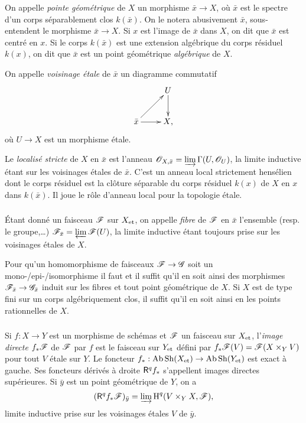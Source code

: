 \documentclass[oneside]{book}
\begin{document}
On appelle \emph{pointe géométrique} de $X$ un morphisme $\bar x\to X$, où 
$\bar x$ est le spectre d'un corps séparablement clos $k(\bar x)$. On le notera 
abusivement $\bar x$, sous-entendent le morphisme $\bar x\to X$. Si $x$ est 
l'image de $\bar x$ dans $X$, on dit que $\bar x$ est centré en $x$. Si le 
corps $k(\bar x)$ est une extension algébrique du corps résiduel $k(x)$, on dit 
que $\bar x$ est un point géométrique \emph{algébrique} de $X$. 

On appelle \emph{voisinage étale} de $\bar x$ un diagramme commutatif 
\[\xymatrix{
  & U \ar[d] \\
  \bar x \ar[ur] \ar[r] 
  & X\text{,}
}\]
où $U\to X$ est un morphisme étale. 

Le \emph{localisé stricte} de $X$ en $\bar x$ est l'anneau 
$\mathscr{O}_{X,\bar x} = \varinjlim \Gamma(U,\mathscr{O}_U)$, la limite inductive étant sur les 
voisinages étales de $\bar x$. C'est un anneau local strictement hensélien dont 
le corps résiduel est la clôture séparable du corps résiduel $k(x)$ de $X$ en 
$x$ dans $k(\bar x)$. Il joue le rôle d'anneau local pour la topologie étale. 





\subsubsection{}\label{I:2-3-2}

Étant donné un faisceau $\mathscr{F}$ sur ${X}_{\textnormal{et}}$, on appelle \emph{fibre} de $\mathscr{F}$ en 
$\bar x$ l'ensemble (resp. le groupe,\dots) $\mathscr{F}_{\bar x}=\varprojlim \mathscr{F}(U)$, 
la limite inductive étant toujours prise sur les voisinages étales de  $X$. 

Pour qu'un homomorphisme de faisceaux $\mathscr{F}\to \mathscr{G}$ soit un 
mono-/epi-/isomorphisme il faut et il suffit qu'il en soit ainsi des morphismes 
$\mathscr{F}_{\bar x}\to \mathscr{G}_{\bar x}$ induit sur les fibres et tout point géométrique 
de $X$. Si $X$ est de type fini sur un corps algébriquement clos, il suffit 
qu'il en soit ainsi en les points rationnelles de $X$. 





\subsubsection{}\label{I:2-3-3}

Si $f:X\to Y$ est un morphisme de schémas et $\mathscr{F}$ un faisceau sur ${X}_{\textnormal{et}}$, 
l'\emph{image directe} $f_* \mathscr{F}$ de $\mathscr{F}$ par $f$ est le faisceau sur ${Y}_{\textnormal{et}}$ 
défini par $f_* \mathscr{F}(V) = \mathscr{F}(X\times_Y V)$ pour tout $V$ étale sur $Y$. Le foncteur 
$f_*:\operatorname{Ab}\operatorname{Sh}({X}_{\textnormal{et}})\to \operatorname{Ab}\operatorname{Sh}({Y}_{\textnormal{et}})$ est exact à gauche. Ses foncteurs 
dérivés à droite $\mathsf{R}^q f_*$ s'appellent images directes supérieures. Si 
$\bar y$ est un point géométrique de $Y$, on a 
\[
  (\mathsf{R}^q f_* \mathscr{F})_{\bar y} = \varinjlim \operatorname{H}^q(V\times_Y X,\mathscr{F})\text{,}
\]
limite inductive prise sur les voisinages étales $V$ de $\bar y$. 
\end{document}
